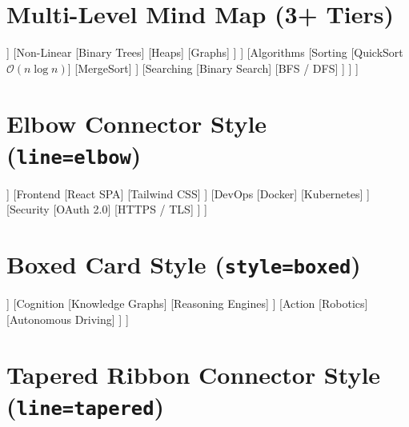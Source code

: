 \documentclass{article}
\begin{document}
\section*{Multi-Level Mind Map (3+ Tiers)}

\begin{mindchart}[theme=rainbow, layout=right, style=classic]
[Computer Science
  [Data Structures
    [Linear
      [Arrays]
      [Linked Lists]
      [Queues \& Stacks]
    ]
    [Non-Linear
      [Binary Trees]
      [Heaps]
      [Graphs]
    ]
  ]
  [Algorithms
    [Sorting
      [QuickSort $\mathcal{O}(n \log n)$]
      [MergeSort]
    ]
    [Searching
      [Binary Search]
      [BFS / DFS]
    ]
  ]
]
\end{mindchart}

\vspace{1.5cm}

\section*{Elbow Connector Style (\texttt{line=elbow})}

\begin{mindchart}[theme=business, layout=balanced, line=elbow]
[Software System
  [Backend
    [Microservices]
    [API Gateway]
    [PostgreSQL]
  ]
  [Frontend
    [React SPA]
    [Tailwind CSS]
  ]
  [DevOps
    [Docker]
    [Kubernetes]
  ]
  [Security
    [OAuth 2.0]
    [HTTPS / TLS]
  ]
]
\end{mindchart}

\vspace{1.5cm}

\section*{Boxed Card Style (\texttt{style=boxed})}

\begin{mindchart}[theme=forest, layout=right, style=boxed]
[Artificial Intelligence
  [Perception
    [Computer Vision]
    [Audio Processing]
  ]
  [Cognition
    [Knowledge Graphs]
    [Reasoning Engines]
  ]
  [Action
    [Robotics]
    [Autonomous Driving]
  ]
]
\end{mindchart}

\newpage

\section*{Tapered Ribbon Connector Style (\texttt{line=tapered})}
\end{document}
